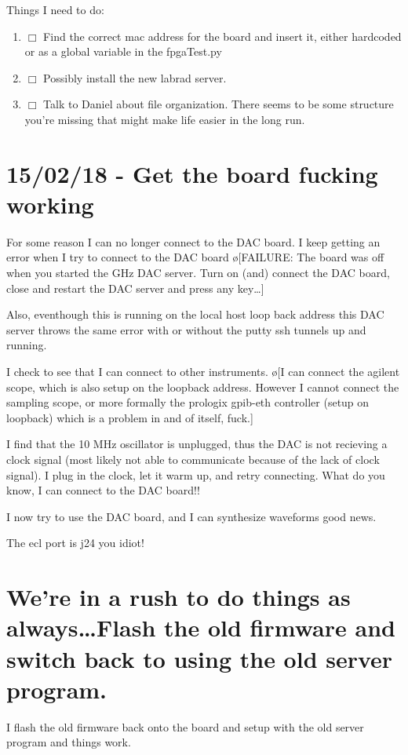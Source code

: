 \documentclass[10pt]{book}
\begin{document}
{Things I need to do:
\begin{enumerate}
    \item $\Box$ Find the correct mac address for the board and insert it, either hardcoded or as a global variable in the fpgaTest.py
    \item $\Box$ Possibly install the new labrad server.
    \item $\Box$ Talk to Daniel about file organization. There seems to be some structure you're missing that might make life easier in the long run.
      
\end{enumerate}

\section{15/02/18 - Get the board fucking working}
For some reason I can no longer connect to the DAC board. I keep getting an error when I try to connect to the DAC board \o[FAILURE: The board was off when you started the GHz DAC server. Turn on (and) connect the DAC board, close and restart the DAC server and press any key\ldots ]{}

Also, eventhough this is running on the local host loop back address this DAC server throws the same error with or without the putty ssh tunnels up and running.

I check to see that I can connect to other instruments. \o[I can connect the agilent scope, which is also setup on the loopback address. However I cannot connect the sampling scope, or more formally the prologix gpib-eth controller (setup on loopback) which is a problem in and of itself, fuck.]{}

I find that the 10 MHz oscillator is unplugged, thus the DAC is not recieving a clock signal (most likely not able to communicate because of the lack of clock signal). I plug in the clock, let it warm up, and retry connecting. What do you know, I can connect to the DAC board!!

I now try to use the DAC board, and I can synthesize waveforms good news.

The ecl port is j24 you idiot!

\section{We're in a rush to do things as always\ldots Flash the old firmware and switch back to using the old server program.}

I flash the old firmware back onto the board and setup with the old server program and things work.

}
\end{document}
